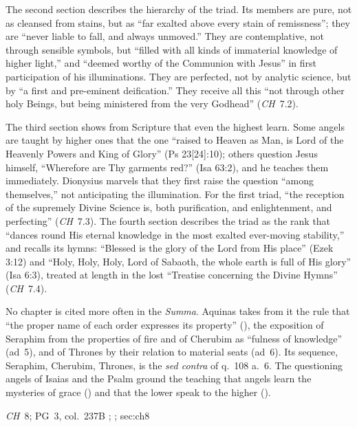 The second section describes the hierarchy of the triad. Its members are
pure, not as cleansed from stains, but as ``far exalted above every stain
of remissness''; they are ``never liable to fall, and always unmoved.''
They are contemplative, not through sensible symbols, but ``filled with
all kinds of immaterial knowledge of higher light,'' and ``deemed worthy
of the Communion with Jesus'' in first participation of his
illuminations. They are perfected, not by analytic science, but by ``a
first and pre-eminent deification.'' They receive all this ``not through
other holy Beings, but being ministered from the very Godhead''
(\emph{CH}~7.2).

The third section shows from Scripture that even the highest learn. Some
angels are taught by higher ones that the one ``raised to Heaven as Man,
is Lord of the Heavenly Powers and King of Glory'' (Ps 23[24]:10); others
question Jesus himself, ``Wherefore are Thy garments red?'' (Isa 63:2),
and he teaches them immediately. Dionysius marvels that they first raise
the question ``among themselves,'' not anticipating the illumination.
For the first triad, ``the reception of the supremely Divine Science is,
both purification, and enlightenment, and perfecting'' (\emph{CH}~7.3).
The fourth section describes the triad as the rank that ``dances round
His eternal knowledge in the most exalted ever-moving stability,'' and
recalls its hymns: ``Blessed is the glory of the Lord from His place''
(Ezek 3:12) and ``Holy, Holy, Holy, Lord of Sabaoth, the whole earth is
full of His glory'' (Isa 6:3), treated at length in the lost ``Treatise
concerning the Divine Hymns'' (\emph{CH}~7.4).

No chapter is cited more often in the \emph{Summa}. Aquinas takes from
it the rule that ``the proper name of each order expresses its
property'' (), the exposition of Seraphim from the
properties of fire and of Cherubim as ``fulness of knowledge'' (ad~5),
and of Thrones by their relation to material seats (ad~6). Its sequence,
Seraphim, Cherubim, Thrones, is the \emph{sed contra} of q.~108 a.~6.
The questioning angels of Isaias and the Psalm ground the teaching that
angels learn the mysteries of grace () and that
the lower speak to the higher ().

{\emph{CH}~8; PG~3, col.~237B}
{; ; }{sec:ch8}

